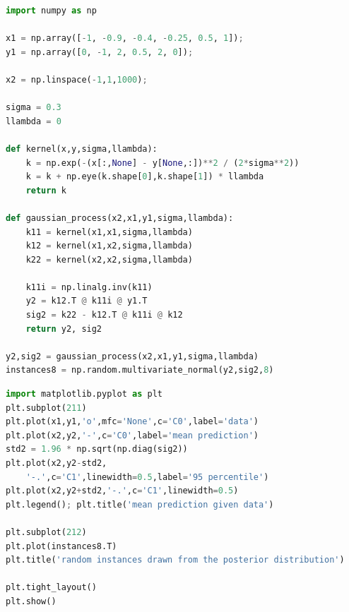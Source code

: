 \documentclass{article}
\begin{document}
\newpage
\begin{lstlisting}[language=Python, caption=python implementation of a gaussian process]
import numpy as np

x1 = np.array([-1, -0.9, -0.4, -0.25, 0.5, 1]);
y1 = np.array([0, -1, 2, 0.5, 2, 0]);

x2 = np.linspace(-1,1,1000);

sigma = 0.3
llambda = 0

def kernel(x,y,sigma,llambda):
    k = np.exp(-(x[:,None] - y[None,:])**2 / (2*sigma**2))
    k = k + np.eye(k.shape[0],k.shape[1]) * llambda
    return k

def gaussian_process(x2,x1,y1,sigma,llambda):
    k11 = kernel(x1,x1,sigma,llambda)
    k12 = kernel(x1,x2,sigma,llambda)
    k22 = kernel(x2,x2,sigma,llambda)

    k11i = np.linalg.inv(k11)
    y2 = k12.T @ k11i @ y1.T
    sig2 = k22 - k12.T @ k11i @ k12
    return y2, sig2

y2,sig2 = gaussian_process(x2,x1,y1,sigma,llambda)
instances8 = np.random.multivariate_normal(y2,sig2,8)
\end{lstlisting}

\begin{lstlisting}[language=Python, caption=python plotting results]
import matplotlib.pyplot as plt
plt.subplot(211)
plt.plot(x1,y1,'o',mfc='None',c='C0',label='data')
plt.plot(x2,y2,'-',c='C0',label='mean prediction')
std2 = 1.96 * np.sqrt(np.diag(sig2))
plt.plot(x2,y2-std2,
	'-.',c='C1',linewidth=0.5,label='95 percentile')
plt.plot(x2,y2+std2,'-.',c='C1',linewidth=0.5)
plt.legend(); plt.title('mean prediction given data')

plt.subplot(212)
plt.plot(instances8.T)
plt.title('random instances drawn from the posterior distribution')

plt.tight_layout()
plt.show()

\end{lstlisting}

\newpage
\nocite{*}


\end{document}
